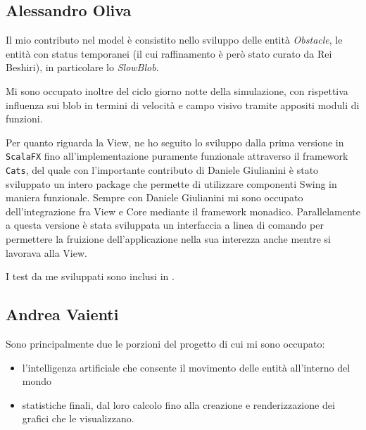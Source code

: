 \subsection{Alessandro Oliva}
Il mio contributo nel model è consistito nello sviluppo delle entità \textit{Obstacle}, le entità con status temporanei (il cui raffinamento è però stato curato da Rei Beshiri), in particolare lo \textit{SlowBlob}.

Mi sono occupato inoltre del ciclo giorno notte della simulazione, con rispettiva influenza sui blob in termini di velocità e campo visivo tramite appositi moduli di funzioni.

Per quanto riguarda la View, ne ho seguito lo sviluppo dalla prima versione in \texttt{ScalaFX} fino all'implementazione puramente funzionale attraverso il framework \texttt{Cats}, del quale con l'importante contributo di Daniele Giulianini è stato sviluppato un intero package che permette di utilizzare componenti Swing in maniera funzionale. Sempre con Daniele Giulianini mi sono occupato dell'integrazione fra View e Core mediante il framework monadico. Parallelamente a questa versione è stata sviluppata un interfaccia a linea di comando per permettere la fruizione dell'applicazione nella sua interezza anche mentre si lavorava alla View.

I test da me sviluppati sono inclusi in .

\subsection{Andrea Vaienti}
Sono principalmente due le porzioni del progetto di cui mi sono occupato: 

\begin{itemize}
    \item l'intelligenza artificiale che consente il movimento delle entità all'interno del mondo
    \item statistiche finali, dal loro calcolo fino alla creazione e renderizzazione dei grafici che le visualizzano.
\end{itemize}

